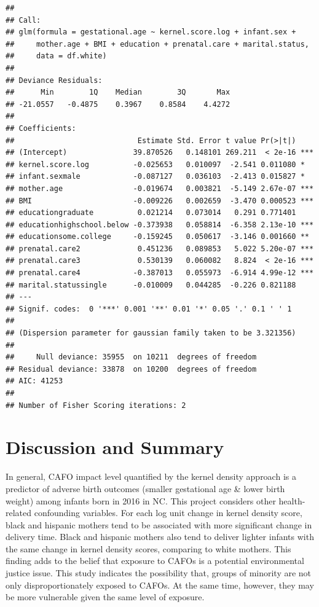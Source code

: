 \documentclass[
  12pt,
]{article}
\begin{document}
\begin{verbatim}
## 
## Call:
## glm(formula = gestational.age ~ kernel.score.log + infant.sex + 
##     mother.age + BMI + education + prenatal.care + marital.status, 
##     data = df.white)
## 
## Deviance Residuals: 
##      Min        1Q    Median        3Q       Max  
## -21.0557   -0.4875    0.3967    0.8584    4.4272  
## 
## Coefficients:
##                            Estimate Std. Error t value Pr(>|t|)    
## (Intercept)               39.870526   0.148101 269.211  < 2e-16 ***
## kernel.score.log          -0.025653   0.010097  -2.541 0.011080 *  
## infant.sexmale            -0.087127   0.036103  -2.413 0.015827 *  
## mother.age                -0.019674   0.003821  -5.149 2.67e-07 ***
## BMI                       -0.009226   0.002659  -3.470 0.000523 ***
## educationgraduate          0.021214   0.073014   0.291 0.771401    
## educationhighschool.below -0.373938   0.058814  -6.358 2.13e-10 ***
## educationsome.college     -0.159245   0.050617  -3.146 0.001660 ** 
## prenatal.care2             0.451236   0.089853   5.022 5.20e-07 ***
## prenatal.care3             0.530139   0.060082   8.824  < 2e-16 ***
## prenatal.care4            -0.387013   0.055973  -6.914 4.99e-12 ***
## marital.statussingle      -0.010009   0.044285  -0.226 0.821188    
## ---
## Signif. codes:  0 '***' 0.001 '**' 0.01 '*' 0.05 '.' 0.1 ' ' 1
## 
## (Dispersion parameter for gaussian family taken to be 3.321356)
## 
##     Null deviance: 35955  on 10211  degrees of freedom
## Residual deviance: 33878  on 10200  degrees of freedom
## AIC: 41253
## 
## Number of Fisher Scoring iterations: 2
\end{verbatim}

\newpage

\hypertarget{discussion-and-summary}{%
\section{Discussion and Summary}\label{discussion-and-summary}}

In general, CAFO impact level quantified by the kernel density approach
is a predictor of adverse birth outcomes (smaller gestational age \&
lower birth weight) among infants born in 2016 in NC. This project
considers other health-related confounding variables. For each log unit
change in kernel density score, black and hispanic mothers tend to be
associated with more significant change in delivery time. Black and
hispanic mothers also tend to deliver lighter infants with the same
change in kernel density scores, comparing to white mothers. This
finding adds to the belief that exposure to CAFOs is a potential
environmental justice issue. This study indicates the possibility that,
groups of minority are not only disproportionately exposed to CAFOs. At
the same time, however, they may be more vulnerable given the same level
of exposure.
\end{document}
